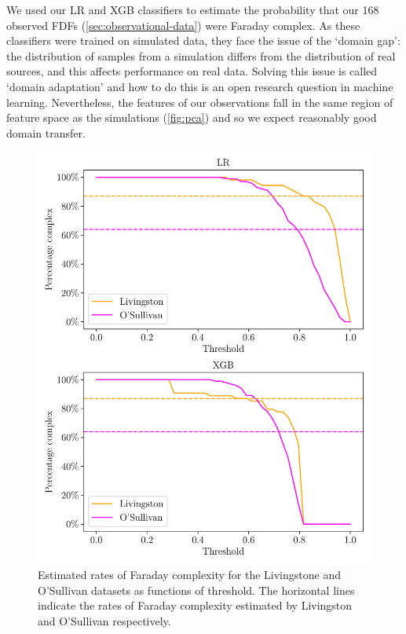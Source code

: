     We used our LR and XGB classifiers to estimate the probability that our 168 observed FDFs (\autoref{sec:observational-data}) were Faraday complex. As these classifiers were trained on simulated data, they face the issue of the `domain gap': the distribution of samples from a simulation differs from the distribution of real sources, and this affects performance on real data. Solving this issue is called `domain adaptation' and how to do this is an open research question in machine learning. Nevertheless, the features of our observations fall in the same region of feature space as the simulations (\autoref{fig:pca}) and so we expect reasonably good domain transfer.

    \begin{figure}
      \centering
      \includegraphics[width=\linewidth]{faraday-images/pc_complex_curves.pdf}
      \caption{Estimated rates of Faraday complexity for the Livingstone and O'Sullivan datasets as functions of threshold. The horizontal lines indicate the rates of Faraday complexity estimated by Livingston and O'Sullivan respectively.}
      \label{fig:faraday-complexity-rates}
    \end{figure}


